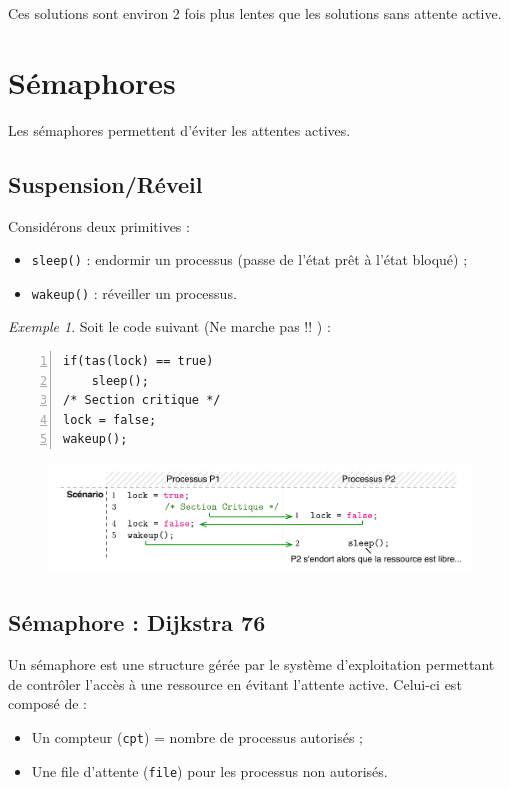 \documentclass[11pt,english,french]{scrreprt}
\theoremstyle{remark}
\newtheorem*{ex*}{Exemple}
\theoremstyle{definition}
\begin{document}
Ces solutions sont environ 2 fois plus lentes que les solutions sans attente active.

\section{Sémaphores}

Les sémaphores permettent d'éviter les attentes actives.
\subsection{Suspension/Réveil}

Considérons deux primitives :\begin{itemize}
	\item \lstinline!sleep()! : endormir un processus (passe de l'état prêt à l'état bloqué) ;
	\item \lstinline!wakeup()! : réveiller un processus.
\end{itemize}

\begin{ex*}
	Soit le code suivant (Ne marche pas !! ) :
\begin{lstlisting}[numbers=left,numberstyle=\footnotesize]
if(tas(lock) == true)
	sleep();
/* Section critique */
lock = false;
wakeup();
\end{lstlisting}
\end{ex*}

\begin{figure}[h!]
	\center
	\vspace{-10pt}
	\includegraphics[scale=.85]{img/SC-sem}
\end{figure}

\subsection{Sémaphore : Dijkstra 76}

Un sémaphore est une structure gérée par le système d'exploitation permettant de contrôler l'accès à une ressource en évitant l'attente active. Celui-ci est composé de :
\begin{itemize}
	\item Un compteur (\lstinline!cpt!) = nombre de processus autorisés ;
	\item Une file d'attente (\lstinline!file!) pour les processus non autorisés.
\end{itemize}
\end{document}
